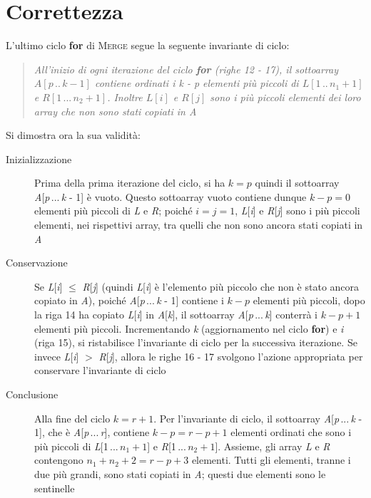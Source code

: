 \documentclass[10pt, a4paper]{report}
\begin{document}
\section{Correttezza}
L'ultimo ciclo \textbf{for} di \textsc{Merge} segue la seguente invariante di ciclo:
\begin{quote}
\textit{All'inizio di ogni iterazione del ciclo \textbf{for} (righe 12 - 17), il sottoarray $A[p\,..\,k - 1]$ contiene ordinati i k - p elementi più piccoli di $L[1\,..\,n_1 + 1]$ e $R[1\,...\,n_2 + 1]$. Inoltre $L[i]$ e $R[j]$ sono i più piccoli elementi dei loro array che non sono stati copiati in A}
\end{quote}
Si dimostra ora la sua validità:
\begin{description}
\item[Inizializzazione]Prima della prima iterazione del ciclo, si ha $k = p$ quindi il sottoarray \textit{A}[\textit{p}\,...\,\textit{k} - 1] è vuoto. Questo sottoarray vuoto contiene dunque $k - p = 0$ elementi più piccoli di \textit{L} e \textit{R}; poiché $i = j = 1$, \textit{L}[\textit{i}] e \textit{R}[\textit{j}] sono i più piccoli elementi, nei rispettivi array, tra quelli che non sono ancora stati copiati in \textit{A}
\item[Conservazione]Se \textit{L}[\textit{i}] $\leq$ \textit{R}[\textit{j}] (quindi \textit{L}[\textit{i}] è l'elemento più piccolo che non è stato ancora copiato in \textit{A}), poiché \textit{A}[\textit{p}\,...\,\textit{k} - 1] contiene i $k - p$ elementi più piccoli, dopo la riga 14 ha copiato \textit{L}[\textit{i}] in \textit{A}[\textit{k}], il sottoarray \textit{A}[\textit{p}\,...\,\textit{k}] conterrà i $k - p + 1$ elementi più piccoli. Incrementando \textit{k} (aggiornamento nel ciclo \textbf{for}) e \textit{i} (riga 15), si ristabilisce l'invariante di ciclo per la successiva iterazione. Se invece \textit{L}[\textit{i}] $>$ \textit{R}[\textit{j}], allora le righe 16 - 17 svolgono l'azione appropriata per conservare l'invariante di ciclo
\item[Conclusione]Alla fine del ciclo $k = r + 1$. Per l'invariante di ciclo, il sottoarray \textit{A}[\textit{p}\,...\,\textit{k} - 1], che è \textit{A}[\textit{p}\,...\,\textit{r}], contiene $k - p = r - p + 1$ elementi ordinati che sono i più piccoli di \textit{L}[1\,...\,$n_1 + 1$] e \textit{R}[1\,...\,$n_2 + 1$]. Assieme, gli array \textit{L} e \textit{R} contengono $n_1 + n_2 + 2 = r - p + 3$ elementi. Tutti gli elementi, tranne i due più grandi, sono stati copiati in \textit{A}; questi due elementi sono le sentinelle
\end{description}
\end{document}
